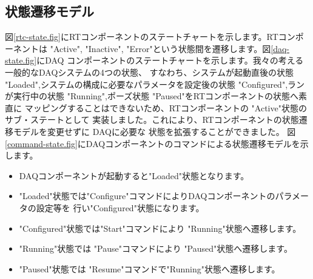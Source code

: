 \documentclass[a4j,10pt,dvips,onecolumn,oneside,final]{jarticle}%
\begin{document}
\subsection{状態遷移モデル}\label{statemodel}
図\ref{rtc-state.fig}にRTコンポーネントのステートチャートを示します。RTコンポーネントは
"Active", "Inactive", "Error"という状態間を遷移します。図\ref{daq-state.fig}にDAQ
コンポーネントのステートチャートを示します。我々の考える一般的なDAQシステムの4つの状態、
すなわち、システムが起動直後の状態 "Loaded",システムの構成に必要なパラメータを設定後の状態 
"Configured",ランが実行中の状態 "Running",ポーズ状態 "Paused"をRTコンポーネントの状態へ素直に
マッピングすることはできないため、RTコンポーネントの "Active"状態のサブ・ステートとして
実装しました。これにより、RTコンポーネントの状態遷移モデルを変更せずに DAQに必要な
状態を拡張することができました。
図\ref{command-state.fig}にDAQコンポーネントのコマンドによる状態遷移モデルを示します。
\begin{itemize}
\item DAQコンポーネントが起動すると"Loaded"状態となります。
\item "Loaded"状態では"Configure"コマンドによりDAQコンポーネントのパラメータの設定等を
行い"Configured"状態になります。
\item "Configured"状態では"Start"コマンドにより "Running"状態へ遷移します。
\item "Running"状態では "Pause"コマンドにより "Paused"状態へ遷移します。
\item "Paused"状態では "Resume"コマンドで"Running"状態へ遷移します。
\end{itemize}
\end{document}
